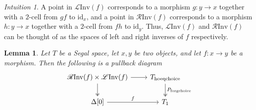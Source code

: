 \documentclass[11pt, a4paper]{amsart}
\newcommand{\id}{\mathrm{id}}
\newcommand{\hoeqchoice}{\mathrm{hoeqchoice}}
\newcommand{\forgchoice}{\mathrm{forgchoice}}
\newcommand{\LInv}{\mathscr{L}\mathrm{Inv}}
\newcommand{\RInv}{\mathscr{R}\mathrm{Inv}}
\newtheorem{lemma}[equation]{Lemma}
\theoremstyle{definition}
\theoremstyle{remark}
\newtheorem{intuition}[equation]{Intuition}
\numberwithin{equation}{section}
\begin{document}
\begin{intuition}
 A point in $\LInv(f)$ corresponds to a morphism $g\colon y \to x$ together with a $2$-cell from $gf$ to $\id_x$, and a point in $\RInv(f)$ corresponds to a morphism $h\colon y \to x$ together with a $2$-cell from $fh$ to $\id_y$. Thus, $\LInv(f)$ and $\RInv(f)$ can be thought of as the spaces of left and right inverses of $f$ respectively.
\end{intuition}

\begin{lemma} \label{lemma:linv rinv pullback}
  Let $T$ be a Segal space, let $x,y$ be two objects, and let $f\colon x \to y$ be a morphism. Then the following is a pullback diagram
\[
\begin{tikzcd}
   \RInv(f) \times \LInv(f) \arrow[r] \arrow[d, twoheadrightarrow] & T_{\hoeqchoice} \arrow[d, "P_{\forgchoice}", twoheadrightarrow] \\
  \Delta[0] \arrow[r, "f"] & T_1
\end{tikzcd}
\]
\end{lemma}
\end{document}
